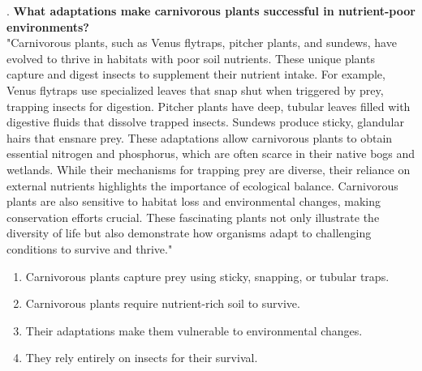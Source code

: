 \documentclass[12pt]{article}
\begin{document}
\vspace{1cm}
. \textbf{What adaptations make carnivorous plants successful in nutrient-poor environments?\\}
"Carnivorous plants, such as Venus flytraps, pitcher plants, and sundews, have evolved to thrive in habitats with poor soil nutrients. These unique plants capture and digest insects to supplement their nutrient intake. For example, Venus flytraps use specialized leaves that snap shut when triggered by prey, trapping insects for digestion. Pitcher plants have deep, tubular leaves filled with digestive fluids that dissolve trapped insects. Sundews produce sticky, glandular hairs that ensnare prey. These adaptations allow carnivorous plants to obtain essential nitrogen and phosphorus, which are often scarce in their native bogs and wetlands. While their mechanisms for trapping prey are diverse, their reliance on external nutrients highlights the importance of ecological balance. Carnivorous plants are also sensitive to habitat loss and environmental changes, making conservation efforts crucial. These fascinating plants not only illustrate the diversity of life but also demonstrate how organisms adapt to challenging conditions to survive and thrive."  
\begin{enumerate}[label=\Alph*.]
    \item Carnivorous plants capture prey using sticky, snapping, or tubular traps.  
    \item Carnivorous plants require nutrient-rich soil to survive.  
    \item Their adaptations make them vulnerable to environmental changes.  
    \item They rely entirely on insects for their survival.  
\end{enumerate}
\end{document}
